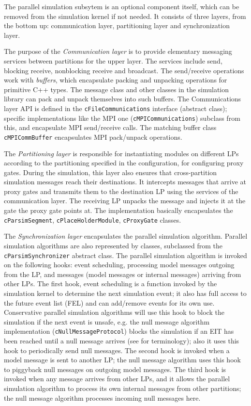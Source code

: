 The parallel simulation subsytem is an optional component
itself, which can be removed from the simulation kernel
if not needed. It consists of three layers, from the bottom up:
communication layer, partitioning layer and synchronization layer.

The purpose of the \textit{Communication layer} is to
provide elementary messaging services between partitions for the
upper layer. The services include send, blocking receive,
nonblocking receive and broadcast. The send/receive operations
work with \textit{buffers}, which encapsulate packing and unpacking
operations for primitive C++ types. The message class and
other classes in the simulation library can pack and unpack
themselves into such buffers. The Communications layer API
is defined in the \texttt{cFileCommunications} interface
(abstract class); specific implementations like the MPI
one (\texttt{cMPICommunications}) subclass from this,
and encapsulate MPI send/receive calls. The matching buffer
class \texttt{cMPICommBuffer} encapsulates MPI pack/unpack
operations.

The \textit{Partitioning layer} is responsible for instantiating
modules on different LPs according to the partitioning specified
in the configuration, for configuring proxy gates.
During the simulation, this layer also ensures that cross-partition
simulation messages reach their destinations. It intercepts messages
that arrive at proxy gates and transmits them to the destination LP
using the services of the communication layer. The receiving LP
unpacks the message and injects it at the gate the proxy gate points at.
The implementation basically encapsulates the
\texttt{cParsimSegment}, \texttt{cPlaceHolderModule},
\texttt{cProxyGate} classes.

The \textit{Synchronization layer} encapsulates the parallel
simulation algorithm. Parallel simulation algorithms are also represented
by classes, subclassed from the \texttt{cParsimSynchronizer} abstract class.
The parallel simulation algorithm is invoked on the following hooks:
event scheduling, processing model messages outgoing from the LP,
and messages (model messages or internal messages) arriving
from other LPs. The first hook, event scheduling is a function
invoked by the simulation kernel to determine the next simulation
event; it also has full access to the future event list (FEL) and
can add/remove events for its own use.
Conservative parallel simulation algorithms will use this hook
to block the simulation if the next event is unsafe, e.g. the
null message algorithm implementation (\texttt{cNullMessageProtocol})
blocks the simulation if an EIT has been reached until a null message
arrives (see \cite{bagrodia00} for terminology); also it uses
this hook to periodically send null messages. The second hook
is invoked when a model message is sent to another LP;
the null message algorithm uses this hook to piggyback null
messages on outgoing model messages. The third hook is invoked
when any message arrives from other LPs, and it allows the
parallel simulation algorithm to process its own internal messages
from other partitions; the null message algorithm processes
incoming null messages here.

